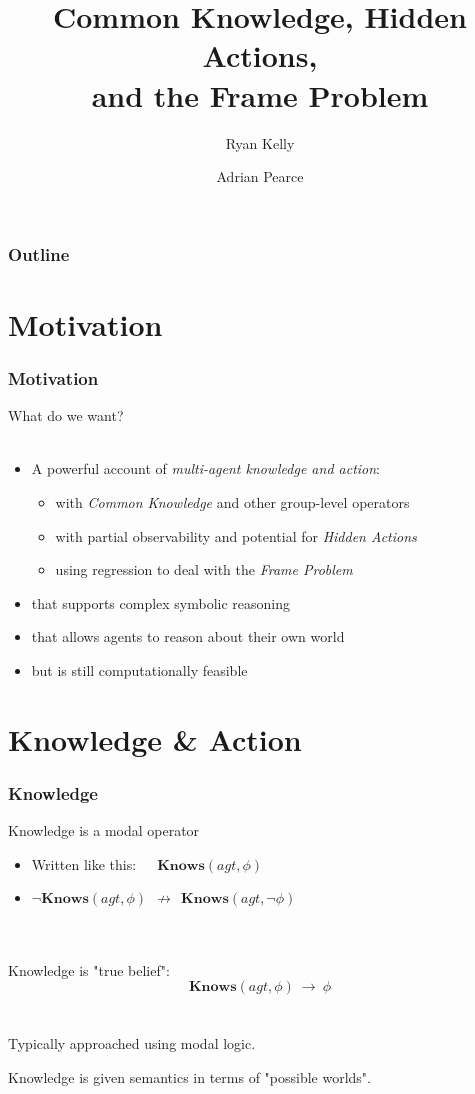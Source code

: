 \documentclass{beamer}
\title{Common Knowledge, Hidden Actions,\\ and the Frame Problem}
\author[Ryan Kelly (rfk@csse.unimelb.edu.au)]{Ryan Kelly \and Adrian Pearce}
\begin{document}
\begin{frame}
  \titlepage
\end{frame}

\begin{frame}
  \frametitle{Outline}
  \tableofcontents
\end{frame}

\section{Motivation}

\begin{frame}
\frametitle{Motivation}
What do we want?\ \\
\ \\
\begin{itemize}
\item A powerful account of \emph{multi-agent knowledge and action}:
  \begin{itemize}
    \item with \emph{Common Knowledge} and other group-level operators
    \item with partial observability and potential for \emph{Hidden Actions}
    \item using regression to deal with the \emph{Frame Problem}
  \end{itemize}
\item that supports complex symbolic reasoning
\item that allows agents to reason about their own world
\item but is still computationally feasible
\end{itemize}
\end{frame}


\section{Knowledge \& Action}

\begin{frame}
\frametitle{Knowledge}

Knowledge is a modal operator
\begin{itemize}
\item Written like this:\ \ \  $\mathbf{Knows}(agt,\phi)$
\item $\neg\mathbf{Knows}(agt,\phi)\ \ \not\rightarrow\ \ \mathbf{Knows}(agt,\neg\phi)$
\end{itemize}
\ \\
\ \\
Knowledge is "true belief":
\[ \mathbf{Knows}(agt,\phi)\ \rightarrow\ \phi \]
\ \\
\ \\
Typically approached using modal logic.

Knowledge is given semantics in terms of "possible worlds".

\end{frame}
\end{document}

